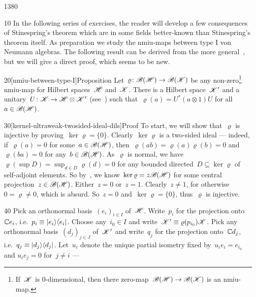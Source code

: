 \begin{parsec}{1380}%
\begin{point}{10}%
In the following series of exercises, the reader will develop
    a few consequences of Stinespring's theorem
    which are in some fields better-known than
    Stinespring's theorem itself.
As preparation we study the nmiu-maps between type I von Neumann algebras.
The following result can be derived
    from the more general~\cite[thm.~5.5]{Takesaki1},
    but we will give a direct proof,
    which seems to be new.~\cite{ref1382}
\end{point}
\begin{point}{20}[nmiu-between-type-I]{Proposition}%
Let~$\varrho\colon \mathscr{B}(\mathscr{H}) \to \mathscr{B}(\mathscr{K})$    
    be any non-zero\footnote{
        If~$\mathscr{K}$ is 0-dimensional,
            then there zero-map~$\mathscr{B}(\mathscr{H}) \to \mathscr{B}(\mathscr{K})$
            is an nmiu-map.} nmiu-map for Hilbert spaces~$\mathscr{H}$ and~$\mathscr{K}$.
There is a Hilbert space~$\mathscr{K}'$
    and a unitary~$U\colon \mathscr{K} \to \mathscr{H} \otimes \mathscr{K}'$
    (see~)
    such that~$\varrho(a) = U^* (a\otimes 1) U $
    for all~$a \in \mathscr{B}(\mathscr{H})$.
    \begin{point}{30}[kernel-ultraweak-twosided-ideal-dils]{Proof}%
To start, we will show that~$\varrho$ is injective
    by proving~$\ker\varrho = \{0\}$.
Clearly~$\ker \varrho$ is a two-sided ideal
    --- indeed, if~$\varrho(a) = 0$ for some~$a\in \mathscr{B}(\mathscr{H})$,
    then~$\varrho(ab) = \varrho(a)\varrho(b) = 0$
        and~$\varrho(ba) = 0$
        for any~$b \in \mathscr{B}(\mathscr{H})$.
As~$\varrho$ is normal,
    we have~$\varrho(\sup D) = \sup_{d \in D} \varrho(d) = 0$
    for any bounded directed~$D\subseteq \ker \varrho$
    of self-adjoint elements.
So by~,
    we know~$\ker \varrho = z \mathscr{B}(\mathscr{H})$
    for some central projection~$z \in \mathscr{B}(\mathscr{H})$.
Either~$z=0$ or~$z=1$.
Clearly~$z\neq 1$, for otherwise~$0=\varrho\neq 0$, which is absurd.
    So~$z=0$ and~$\ker \varrho = \{0\}$, thus~$\varrho $ is injective.
\begin{point}{40}%
Pick an orthonormal basis~$(e_i)_{i \in I}$ of~$\mathscr{H}$.
Write~$p_i$ for the projection onto~$\mathbb{C} e_i$,
    i.e.~$p_i \equiv \left|e_i\right>\!\left<e_i\right|$.
Choose any~$i_0 \in I$
    and write~$\mathscr{K}' \equiv \varrho(p_{i_0}) \mathscr{K}$.
Pick any orthonormal basis~$(d_j)_{j \in J}$ of~$\mathscr{K}'$
    and write~$q_j$ for the projection onto~$\mathbb{C} d_j$,
    i.e.~$q_j \equiv \left|d_j\right>\!\left<d_j\right|$.
Let~$u_i$ denote the unique partial
        isometry fixed by~$u_i e_i = e_{i_0}$ and
                $u_i e_j = 0$ for~$j\neq i$ ---

\end{point}
\end{point}
\end{point}
\end{parsec}
